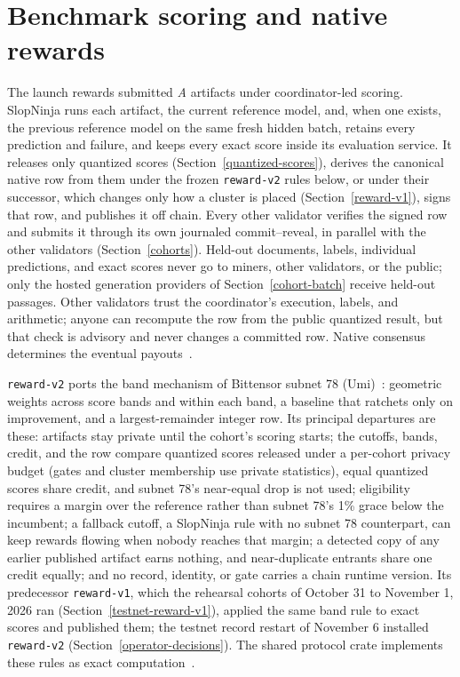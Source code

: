 \section{Benchmark scoring and native rewards}\label{benchmark-scoring-and-mechanism-mapping}

The launch rewards submitted \textit{A} artifacts under coordinator-led
scoring. SlopNinja runs each artifact, the current reference model, and,
when one exists, the previous reference model on the same fresh hidden batch, retains every prediction and failure, and keeps every
exact score inside its evaluation service. It releases only quantized scores
(Section~\ref{quantized-scores}), derives the canonical native row from them
under the frozen \texttt{reward-v2} rules below, or under their successor,
which changes only how a cluster is placed (Section~\ref{reward-v1}), signs
that row, and publishes
it off chain. Every other validator verifies the signed row and submits it
through its own journaled commit--reveal, in parallel with the other validators
(Section~\ref{cohorts}). Held-out documents, labels, individual predictions,
and exact scores never go to miners, other validators, or the public; only the
hosted generation providers of Section~\ref{cohort-batch} receive held-out
passages. Other
validators trust the coordinator's execution, labels, and arithmetic; anyone
can recompute the row from the public quantized result, but that check is
advisory and never changes a committed row. Native
consensus determines the eventual payouts~\cite{btchainconsensus,btemissions}.

\texttt{reward-v2} ports the band mechanism of Bittensor subnet 78
(Umi)~\cite{umisn78}: geometric weights across score bands and within each band,
a baseline that ratchets only on improvement, and a largest-remainder integer
row. Its principal departures are these: artifacts stay private until the
cohort's scoring starts; the cutoffs, bands, credit, and the row compare
quantized scores released under a per-cohort privacy budget (gates and cluster
membership use private statistics), equal quantized scores share credit, and subnet 78's near-equal drop is not used; eligibility
requires a margin over the reference rather than
subnet 78's 1\% grace below the incumbent; a fallback cutoff, a SlopNinja rule
with no subnet 78 counterpart, can keep rewards flowing when nobody reaches that
margin; a detected copy of any earlier published artifact earns nothing, and
near-duplicate entrants share one credit equally; and no record, identity, or
gate carries a chain runtime version. Its predecessor \texttt{reward-v1},
which the rehearsal cohorts of October 31 to November 1, 2026 ran
(Section~\ref{testnet-reward-v1}), applied the same band rule to exact scores
and published them; the testnet record restart of November 6 installed
\texttt{reward-v2} (Section~\ref{operator-decisions}). The shared protocol
crate implements these rules as exact computation~\cite{protocolcrate}.

